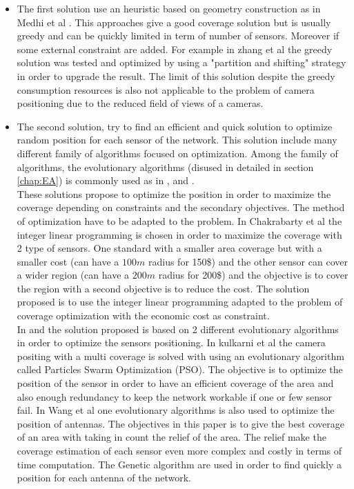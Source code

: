 \begin{itemize}


\item	The first solution use an heuristic based on geometry construction as in  Medhi et al \cite{175*medhi2013}. This approaches give a good coverage solution but is usually greedy and can be quickly limited in term of number of sensors. Moreover if some external constraint are added.  For example in zhang et al \cite{174*zhang2016} the greedy solution was tested and optimized by using a "partition and shifting" strategy in order to upgrade the result.
The limit of this solution despite the greedy consumption resources is also not applicable to the problem of camera positioning due to the reduced field of views of a cameras.  \\
\item	The second solution, try to find an efficient and quick solution to optimize  random position for each sensor of the network.  
This solution include many different family of algorithms focused on optimization.
Among the family of algorithms, the evolutionary algorithms (disused in detailed in section \ref{chap:EA}) is commonly used as in \cite{200*kulkarni2011,59*wang2008}, and \cite{150*chakrabarty2002}. \\
These solutions propose to optimize the position in order to maximize the coverage depending on constraints and the secondary objectives. The method of optimization have to be adapted to the problem. 
In Chakrabarty et al \cite{150*chakrabarty2002} the integer linear programming  is chosen in order to maximize the coverage with 2 type of sensors. One standard with a smaller area coverage but with a smaller cost (can have a $100m$ radius for 150\$) and the other sensor can cover a wider region (can have a $200m$  radius for 200\$) and the objective is to cover the region with a second objective is to reduce the cost. The solution proposed is to use the integer linear programming adapted to the problem of coverage optimization with the economic cost as constraint. \\
In \cite{59*wang2008} and \cite{200*kulkarni2011} the solution proposed is based on 2 different evolutionary algorithms in order to optimize the sensors positioning. 
In kulkarni et al \cite{200*kulkarni2011} the camera positing with a multi coverage is solved with using an evolutionary algorithm called Particles Swarm Optimization (PSO). The objective is to optimize the position of the sensor in order to have an efficient coverage of the area and also enough redundancy to keep the network workable if one or few sensor fail. In Wang et al \cite{59*wang2008} one evolutionary algorithms is also used to optimize the position of antennas. The objectives in this paper is to give the best coverage of an area with taking in count the relief of the area. The relief make the coverage estimation of each sensor even more complex and costly in terms of time computation. The Genetic algorithm are used in order to find quickly a position for each antenna of the network. 
\end{itemize}

